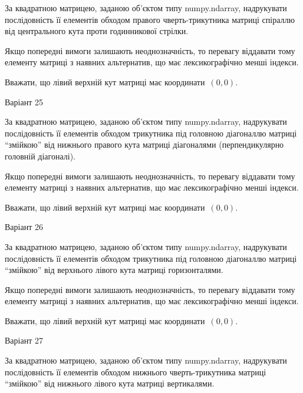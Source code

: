 \documentclass[11pt]{article}
\begin{document}
За квадратною матрицею, заданою об'єктом типу numpy.ndarray, надрукувати послідовність її елементів обходом правого чверть-трикутника матриці спіраллю від центрального кута проти годинникової стрілки.

\vspace{2mm}
Якщо попередні вимоги залишають неоднозначність, то перевагу віддавати тому елементу матриці з наявних альтернатив, що має лексикографічно менші індекси.

Вважати, що лівий верхній кут матриці має координати~$(0,0)$.



{\Large \center  Варіант  25\par \bigskip\bigskip}

За квадратною матрицею, заданою об'єктом типу numpy.ndarray, надрукувати послідовність її елементів обходом трикутника під головною діагоналлю матриці ``змійкою'' від нижнього правого кута матриці діагоналями (перпендикулярно головній діагоналі).

\vspace{2mm}
Якщо попередні вимоги залишають неоднозначність, то перевагу віддавати тому елементу матриці з наявних альтернатив, що має лексикографічно менші індекси.

Вважати, що лівий верхній кут матриці має координати~$(0,0)$.



{\Large \center  Варіант  26\par \bigskip\bigskip}

За квадратною матрицею, заданою об'єктом типу numpy.ndarray, надрукувати послідовність її елементів обходом трикутника під головною діагоналлю матриці ``змійкою'' від верхнього лівого кута матриці горизонталями.

\vspace{2mm}
Якщо попередні вимоги залишають неоднозначність, то перевагу віддавати тому елементу матриці з наявних альтернатив, що має лексикографічно менші індекси.

Вважати, що лівий верхній кут матриці має координати~$(0,0)$.



{\Large \center  Варіант  27\par \bigskip\bigskip}

За квадратною матрицею, заданою об'єктом типу numpy.ndarray, надрукувати послідовність її елементів обходом нижнього чверть-трикутника матриці ``змійкою'' від нижнього лівого кута матриці вертикалями.
\end{document}
